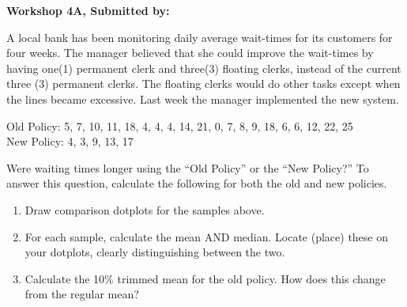 \documentclass[11pt, chapterprefix=true]{scrbook}\usepackage[]{graphicx}\usepackage[]{color}
\begin{document}
\begin{exercises}
\begin{exercise}
    \begin{center}
\begin{flushleft}\textbf{\large \hfill Workshop 4A, Submitted by: }\end{flushleft}

\end{center}

A local bank has been monitoring daily average wait-times for its customers for four weeks. The manager believed that she could improve the wait-times by having one(1) permanent clerk and three(3) floating clerks, instead of the current three (3) permanent clerks. The floating clerks would do other tasks except when the lines became excessive. Last week the manager implemented the new system. 

Old Policy:   5, 7, 10, 11, 18, 4, 4, 4, 14, 21, 0, 7, 8, 9, 18, 6, 6, 12, 22, 25 \\ 
New Policy: 4, 3, 9, 13, 17

Were waiting times longer using the ``Old Policy'' or the ``New Policy?''  To answer this question, calculate the following for both the old and new policies.

\begin{enumerate}
  \item Draw comparison dotplots for the samples above.
  \item For each sample, calculate the mean AND median.  Locate (place) these on your dotplots, clearly distinguishing between the two.
  \item Calculate the 10\% trimmed mean for the old policy.  How does this change from the regular mean?
\end{enumerate}
\end{exercise} 
\begin{solution}  %


\end{solution}
\end{exercises}
\end{document}
